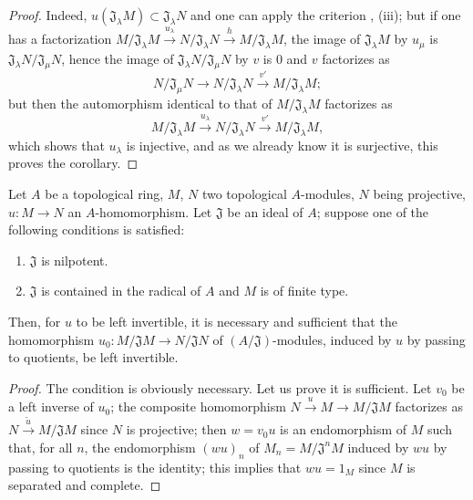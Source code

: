 \begin{proof}
Indeed, $u(\mathfrak{J}_\lambda M)\subset\mathfrak{J}_\lambda N$ and one can apply the criterion , (iii);
but if one has a factorization $M/\mathfrak{J}_\lambda M\xrightarrow{u_\lambda}N/\mathfrak{J}_\lambda N\xrightarrow{h}M/\mathfrak{J}_\lambda M$, the image of $\mathfrak{J}_\lambda M$ by $u_\mu$ is $\mathfrak{J}_\lambda N/\mathfrak{J}_\mu N$, hence the image of $\mathfrak{J}_\lambda N/\mathfrak{J}_\mu N$ by $v$ is $0$ and $v$ factorizes as
\[
  N/\mathfrak{J}_\mu N\to N/\mathfrak{J}_\lambda N\xrightarrow{v'}M/\mathfrak{J}_\lambda M;
\]
but then the automorphism identical to that of $M/\mathfrak{J}_\lambda M$ factorizes as
\[
  M/\mathfrak{J}_\lambda M\xrightarrow{u_\lambda}N/\mathfrak{J}_\lambda N\xrightarrow{v'}M/\mathfrak{J}_\lambda M,
\]
which shows that $u_\lambda$ is injective, and as we already know it is surjective, this proves the corollary.
\end{proof}

\begin{proposition}[19.1.5]
\label{0.19.1.5}
Let $A$ be a topological ring, $M$, $N$ two topological $A$-modules, $N$ being projective, $u:M\to N$ an $A$-homomorphism.
Let $\mathfrak{J}$ be an ideal of $A$;
suppose one of the following conditions is satisfied:
\begin{enumerate}
  \item[(i)] $\mathfrak{J}$ is nilpotent.
  \item[(ii)] $\mathfrak{J}$ is contained in the radical of $A$ and $M$ is of finite type.
\end{enumerate}
Then, for $u$ to be left invertible, it is necessary and sufficient that the homomorphism $u_0:M/\mathfrak{J}M\to N/\mathfrak{J}N$ of $(A/\mathfrak{J})$-modules, induced by $u$ by passing to quotients, be left invertible.
\end{proposition}

\begin{proof}
The condition is obviously necessary.
Let us prove it is sufficient.
Let $v_0$ be a left inverse of $u_0$;
the composite homomorphism $N\xrightarrow{u}M\to M/\mathfrak{J}M$ factorizes as $N\xrightarrow{\tilde{u}}M/\mathfrak{J}M$ since $N$ is projective;
then $w=v_0u$ is an endomorphism of $M$ such that, for all $n$, the endomorphism $(wu)_n$ of $M_n=M/\mathfrak{J}^nM$ induced by $wu$ by passing to quotients is the identity;
this implies that $wu=1_M$ since $M$ is separated and complete.
\end{proof}

